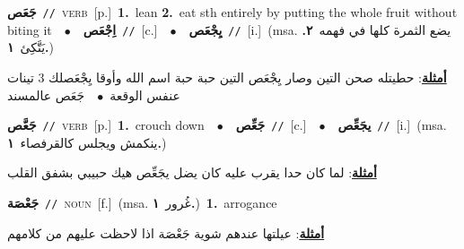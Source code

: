 \documentclass[10pt,a4paper,twoside]{article} %
\begin{document}
\begin{multicols}{2}
{\setlength\topsep{0pt}\textbf{\foreignlanguage{arabic}{جَعَص}}\ {\color{gray}\texttt{//}\color{black}}\ \textsc{verb}\ [p.]\ \textbf{1.}~lean  \textbf{2.}~eat sth entirely by putting the whole fruit without biting it\ \ $\bullet$\ \ \setlength\topsep{0pt}\textbf{\foreignlanguage{arabic}{اِجْعَص}}\ {\color{gray}\texttt{//}\color{black}}\ [c.]\ \ $\bullet$\ \ \setlength\topsep{0pt}\textbf{\foreignlanguage{arabic}{يِجْعَص}}\ {\color{gray}\texttt{//}\color{black}}\ [i.]\ \color{gray}(msa. \foreignlanguage{arabic}{يضع الثمرة كلها في فهمه}~\foreignlanguage{arabic}{\textbf{٢.}}  \foreignlanguage{arabic}{يَتَّكِئ}~\foreignlanguage{arabic}{\textbf{١.}})\color{black}\  \begin{flushright}\color{gray}\foreignlanguage{arabic}{\textbf{\underline{\foreignlanguage{arabic}{أمثلة}}}: حطيتله صحن التين وصار يِجْعَص التين حبة حبة اسم الله وأوقا يِجْعَصلك 3 تينات عنفس الوقعة\ $\bullet$\ \  جَعَص عالمسند}\end{flushright}\color{black}} \vspace{2mm}

{\setlength\topsep{0pt}\textbf{\foreignlanguage{arabic}{جَعَّص}}\ {\color{gray}\texttt{//}\color{black}}\ \textsc{verb}\ [p.]\ \textbf{1.}~crouch down\ \ $\bullet$\ \ \setlength\topsep{0pt}\textbf{\foreignlanguage{arabic}{جَعِّص}}\ {\color{gray}\texttt{//}\color{black}}\ [c.]\ \ $\bullet$\ \ \setlength\topsep{0pt}\textbf{\foreignlanguage{arabic}{يجَعِّص}}\ {\color{gray}\texttt{//}\color{black}}\ [i.]\ \color{gray}(msa. \foreignlanguage{arabic}{ينكمش ويجلس كالقرفصاء}~\foreignlanguage{arabic}{\textbf{١.}})\color{black}\  \begin{flushright}\color{gray}\foreignlanguage{arabic}{\textbf{\underline{\foreignlanguage{arabic}{أمثلة}}}: لما كان حدا يقرب عليه كان يضل يجَعِّص هيك حبيبي بشفق القلب}\end{flushright}\color{black}} \vspace{2mm}

{\setlength\topsep{0pt}\textbf{\foreignlanguage{arabic}{جَعْصَة}}\ {\color{gray}\texttt{//}\color{black}}\ \textsc{noun}\ [f.]\ \color{gray}(msa. \foreignlanguage{arabic}{غُرور}~\foreignlanguage{arabic}{\textbf{١.}})\color{black}\ \textbf{1.}~arrogance\  \begin{flushright}\color{gray}\foreignlanguage{arabic}{\textbf{\underline{\foreignlanguage{arabic}{أمثلة}}}: عيلتها عندهم شوية جَعْصَة اذا لاحظت عليهم من كلامهم}\end{flushright}\color{black}} \vspace{2mm}


\end{multicols}
\end{document}
